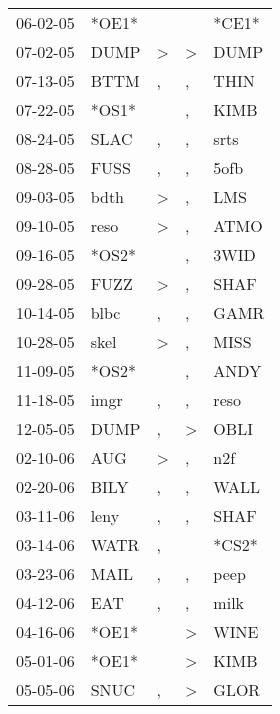 \begin{supertabular}{lllll}
 06-02-05 &  *OE1* &                  &                  &  *CE1* \\
 07-02-05 &   DUMP &     \textgreater &     \textgreater &   DUMP \\
 07-13-05 &   BTTM &                , &                , &   THIN \\
 07-22-05 &  *OS1* &                  &                , &   KIMB \\
 08-24-05 &   SLAC &                , &                , &   srts \\
 08-28-05 &   FUSS &                , &                , &   5ofb \\
 09-03-05 &   bdth &     \textgreater &                , &    LMS \\
 09-10-05 &   reso &     \textgreater &                , &   ATMO \\
 09-16-05 &  *OS2* &                  &                , &   3WID \\
 09-28-05 &   FUZZ &     \textgreater &                , &   SHAF \\
 10-14-05 &   blbc &                , &                , &   GAMR \\
 10-28-05 &   skel &     \textgreater &                , &   MISS \\
 11-09-05 &  *OS2* &                  &                , &   ANDY \\
 11-18-05 &   imgr &                , &                , &   reso \\
 12-05-05 &   DUMP &                , &     \textgreater &   OBLI \\
 02-10-06 &    AUG &     \textgreater &                , &    n2f \\
 02-20-06 &   BILY &                , &                , &   WALL \\
 03-11-06 &   leny &                , &                , &   SHAF \\
 03-14-06 &   WATR &                , &                  &  *CS2* \\
 03-23-06 &   MAIL &                , &                , &   peep \\
 04-12-06 &    EAT &                , &                , &   milk \\
 04-16-06 &  *OE1* &                  &     \textgreater &   WINE \\
 05-01-06 &  *OE1* &                  &     \textgreater &   KIMB \\
 05-05-06 &   SNUC &                , &     \textgreater &   GLOR \\

\end{supertabular}
